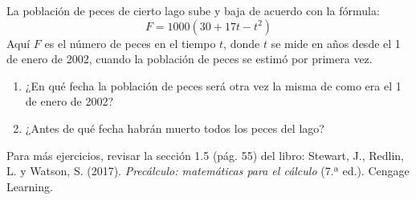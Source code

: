 \documentclass[a4,11pt]{aleph-notas}
\begin{document}
\begin{ejer}
    La población de peces de cierto lago sube y baja de acuerdo con la fórmula:
    \[
        F = 1000(30 + 17t - t^2)
    \]
    Aquí \(F\) es el número de peces en el tiempo \(t\), donde \(t\) se mide en años desde el 1 de enero de 2002, cuando la población de peces se estimó por primera vez.
    
    \begin{enumerate}
        \item ¿En qué fecha la población de peces será otra vez la misma de como era el 1 de enero de 2002?
        \item ¿Antes de qué fecha habrán muerto todos los peces del lago?
    \end{enumerate}
\end{ejer}


\begin{advertencia}
    Para más ejercicios, revisar la sección 1.5 (pág. 55) del libro: Stewart, J., Redlin, L. y Watson, S. (2017). \textit{Precálculo: matemáticas para el cálculo} (7.ª ed.). Cengage Learning.
\end{advertencia}


 
\end{document}

